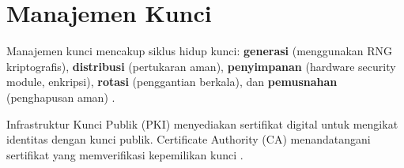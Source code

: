 \section{Manajemen Kunci}

Manajemen kunci mencakup siklus hidup kunci: \textbf{generasi} (menggunakan RNG kriptografis), \textbf{distribusi} (pertukaran aman), \textbf{penyimpanan} (hardware security module, enkripsi), \textbf{rotasi} (penggantian berkala), dan \textbf{pemusnahan} (penghapusan aman) \cite{stallings2017,ferguson2010,menezes1996}.

Infrastruktur Kunci Publik (PKI) menyediakan sertifikat digital untuk mengikat identitas dengan kunci publik. Certificate Authority (CA) menandatangani sertifikat yang memverifikasi kepemilikan kunci \cite{stallings2017,ferguson2010,menezes1996}.
